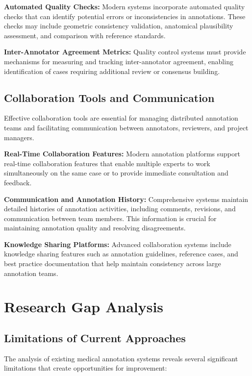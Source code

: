 \textbf{Automated Quality Checks:} Modern systems incorporate automated quality checks that can identify potential errors or inconsistencies in annotations. These checks may include geometric consistency validation, anatomical plausibility assessment, and comparison with reference standards.

\textbf{Inter-Annotator Agreement Metrics:} Quality control systems must provide mechanisms for measuring and tracking inter-annotator agreement, enabling identification of cases requiring additional review or consensus building.

\subsection{Collaboration Tools and Communication}

Effective collaboration tools are essential for managing distributed annotation teams and facilitating communication between annotators, reviewers, and project managers.

\textbf{Real-Time Collaboration Features:} Modern annotation platforms support real-time collaboration features that enable multiple experts to work simultaneously on the same case or to provide immediate consultation and feedback.

\textbf{Communication and Annotation History:} Comprehensive systems maintain detailed histories of annotation activities, including comments, revisions, and communication between team members. This information is crucial for maintaining annotation quality and resolving disagreements.

\textbf{Knowledge Sharing Platforms:} Advanced collaboration systems include knowledge sharing features such as annotation guidelines, reference cases, and best practice documentation that help maintain consistency across large annotation teams.

\section{Research Gap Analysis}

\subsection{Limitations of Current Approaches}

The analysis of existing medical annotation systems reveals several significant limitations that create opportunities for improvement:


